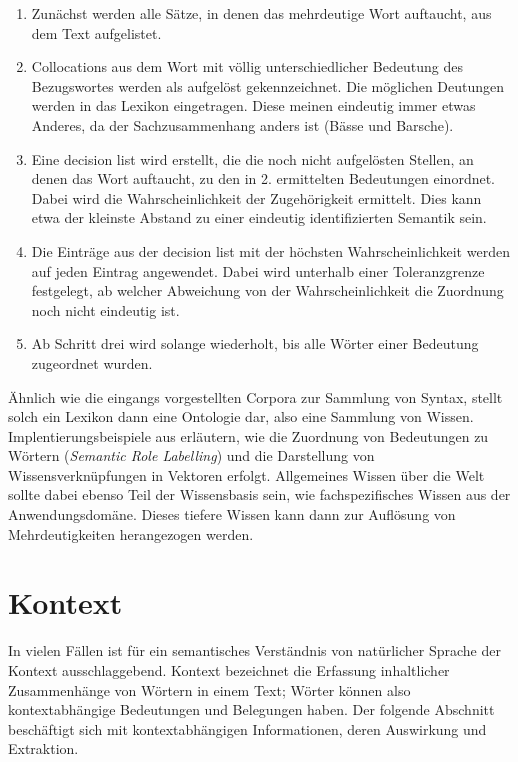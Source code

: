 \documentclass[12pt]{report}
\begin{document}
\begin{enumerate}
\item Zunächst werden alle Sätze, in denen das mehrdeutige Wort auftaucht, aus dem Text aufgelistet.
\item Collocations aus dem Wort mit völlig unterschiedlicher Bedeutung des Bezugswortes werden als aufgelöst gekennzeichnet. Die möglichen Deutungen werden in das Lexikon eingetragen. Diese meinen eindeutig immer etwas Anderes, da der Sachzusammenhang anders ist (Bässe und Barsche).
\item Eine decision list wird erstellt, die die noch nicht aufgelösten Stellen, an denen das Wort auftaucht, zu den in 2. ermittelten Bedeutungen einordnet. Dabei wird die Wahrscheinlichkeit der Zugehörigkeit ermittelt. Dies kann etwa der kleinste Abstand zu einer eindeutig identifizierten Semantik sein.
\item Die Einträge aus der decision list mit der höchsten Wahrscheinlichkeit werden auf jeden Eintrag angewendet. Dabei wird unterhalb einer Toleranzgrenze festgelegt, ab welcher Abweichung von der Wahrscheinlichkeit die Zuordnung noch nicht eindeutig ist. 
\item Ab Schritt drei wird solange wiederholt, bis alle Wörter einer Bedeutung zugeordnet wurden.
\end{enumerate} 

Ähnlich wie die eingangs vorgestellten Corpora zur Sammlung von Syntax, stellt solch ein Lexikon dann eine Ontologie dar, also eine Sammlung von Wissen. Implentierungsbeispiele aus \cite{col11} erläutern, wie die Zuordnung von Bedeutungen zu Wörtern (\textit{Semantic Role Labelling}) und die Darstellung von Wissensverknüpfungen in Vektoren erfolgt. Allgemeines Wissen über die Welt sollte dabei ebenso Teil der Wissensbasis sein, wie fachspezifisches Wissen aus der Anwendungsdomäne. Dieses tiefere Wissen kann dann zur Auflösung von Mehrdeutigkeiten herangezogen werden.

\section{Kontext}
In vielen Fällen ist für ein semantisches Verständnis von natürlicher Sprache der Kontext ausschlaggebend. Kontext bezeichnet die Erfassung inhaltlicher Zusammenhänge von Wörtern in einem Text; Wörter können also kontextabhängige Bedeutungen und Belegungen haben. Der folgende Abschnitt beschäftigt sich mit kontextabhängigen Informationen, deren Auswirkung und Extraktion. 
\end{document}
